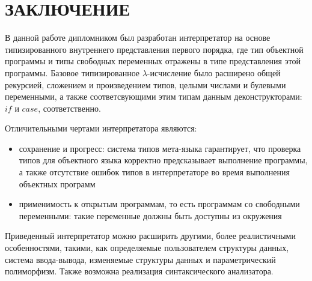 \section*{ЗАКЛЮЧЕНИЕ}

В данной работе дипломником был разработан интерпретатор на основе типизированного внутреннего представления первого порядка, где тип объектной программы и типы свободных переменных отражены в типе представления этой программы. Базовое типизированное $\lambda$-исчисление было расширено общей рекурсией, сложением и произведением типов, целыми числами и булевыми переменными, а также соответсвующими этим типам данным деконструкторами: $if$ и $case$, соответственно.

Отличительными чертами интерпретатора являются:
\begin{itemize}
\item сохранение и прогресс: система типов мета-языка гарантирует, что проверка типов для объектного языка корректно предсказывает выполнение программы, а также отсутствие ошибок типов в интерпретаторе во время выполнения объектных программ
\item применимость к открытым программам, то есть программам со свободными переменными: такие переменные должны быть доступны из окружения
\end{itemize}

Приведенный интерпретатор можно расширить другими, более реалистичными особенностями, такими, как определяемые пользователем структуры данных, система ввода-вывода, изменяемые структуры данных и параметрический полиморфизм. Также возможна реализация синтаксического анализатора.